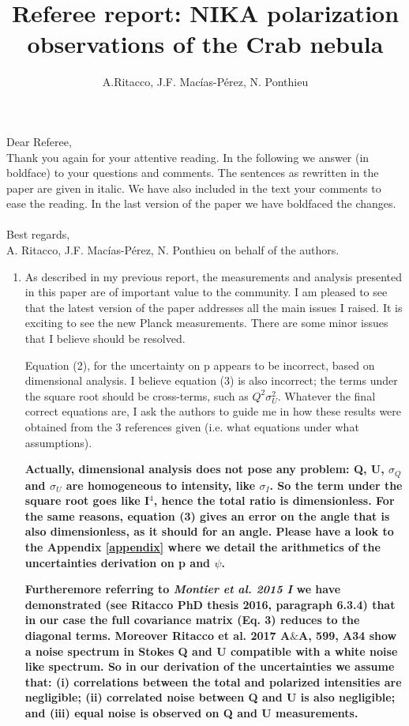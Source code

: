 \documentclass[12pt]{article}
\title{Referee report: NIKA polarization observations of the Crab nebula}
\author{A.Ritacco, J.F. Macías-Pérez, N. Ponthieu}
\begin{document}
\maketitle

\noindent Dear Referee,\\
Thank you again for your attentive reading. 
In the following we answer (in boldface) to your questions and comments.
The sentences as rewritten in the paper are given in italic.
We have also included in the text your comments to ease the reading. 
In the last version of the paper we have boldfaced the changes. \\  \\
Best regards,\\
A. Ritacco, J.F. Macías-Pérez, N. Ponthieu on behalf of the authors.


\begin{enumerate}
    \item 
{
As described in my previous report, the measurements and analysis 
presented in this paper are of important value to the community. I am 
pleased to see that the latest version of the paper addresses all the 
main issues I raised. It is exciting to see the new Planck 
measurements. There are some minor issues that I believe 
should be resolved. 
}

Equation (2), for the uncertainty on p appears to be incorrect, based 
on dimensional analysis. I believe equation (3) is also incorrect; 
the terms under the square root should be cross-terms, such as 
$Q^2\sigma_U^2$. Whatever the final correct equations are, I ask the 
authors to guide me in how these results were obtained from the 3 
references given (i.e. what equations under what assumptions).

{\bf Actually, dimensional analysis does not pose any problem: Q, U, $\sigma_Q$ and $\sigma_U$ are homogeneous to intensity, like $\sigma_I$. So the term under the square root goes like I$^4$, hence the total ratio is dimensionless. For the same reasons, equation (3) gives an error on the angle that is also dimensionless, as it should for an angle. Please have a look to the Appendix \ref{appendix} where we detail the arithmetics of the uncertainties derivation on p and $\psi$. }

{\bf Furtheremore referring to {\it Montier et al. 2015 I} we have demonstrated (see Ritacco PhD thesis 2016, paragraph 6.3.4) that in our case the full covariance matrix (Eq. 3) reduces to the diagonal terms. Moreover Ritacco et al. 2017 A$\&$A, 599, A34 show a noise spectrum in Stokes Q and U compatible with a white noise like spectrum. So in our derivation of the uncertainties we assume that: (i) correlations between the total and polarized intensities are negligible; (ii) correlated noise between Q and U is also negligible; and (iii) equal noise is observed on Q and U measurements.}


\end{enumerate}
\end{document}
